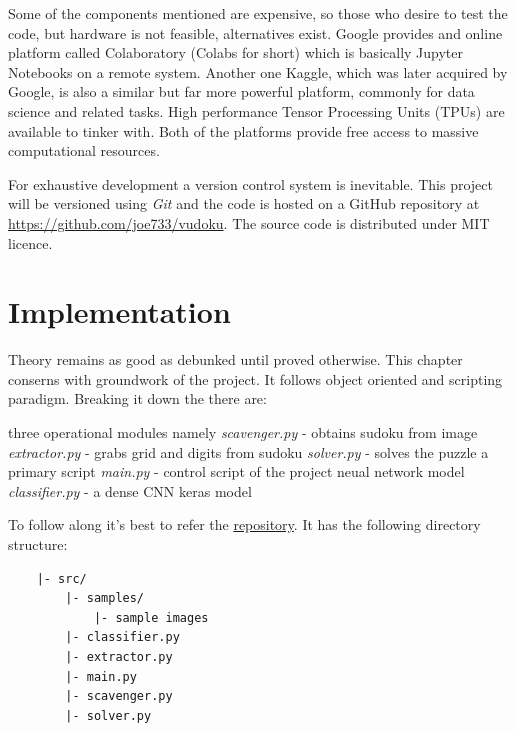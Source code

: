 \documentclass[12pt, a4paper]{report}
\begin{document}
Some of the components mentioned are expensive, so those who desire to test the code, but hardware is not feasible, alternatives exist. Google provides and online platform called Colaboratory (Colabs for short) which is basically Jupyter Notebooks on a remote system. Another one Kaggle, which was later acquired by Google, is also a similar but far more powerful platform, commonly for data science and related tasks. High performance Tensor Processing Units (TPUs) are available to tinker with. Both of the platforms provide free access to massive computational resources.

For exhaustive development a version control system is inevitable. This project will be versioned using \emph{Git} and the code is hosted on a GitHub repository at \url{https://github.com/joe733/vudoku}. The source code is distributed under MIT licence.
\vspace*{\fill}

\chapter{Implementation}
\label{chap:implementation}
\thispagestyle{fancy}
\hspace{0.5cm} Theory remains as good as debunked until proved otherwise. This chapter conserns with groundwork of the project. It follows object oriented and scripting paradigm. Breaking it down the there are:

\begin{outline}
    \1 three operational modules namely
        \2 \textit{scavenger.py} - obtains sudoku from image
        \2 \textit{extractor.py} - grabs grid and digits from sudoku
        \2 \textit{solver.py} - solves the puzzle
    \1 a primary script
        \2 \textit{main.py} - control script of the project
    \1  neual network model
        \2 \textit{classifier.py} - a dense CNN keras model
\end{outline}

To follow along it's best to refer the \href{https://github.com/joe733/vudoku}{repository}. It has the following directory structure:

\begin{lstlisting}
    |- src/
        |- samples/
            |- sample images
        |- classifier.py
        |- extractor.py
        |- main.py
        |- scavenger.py
        |- solver.py
\end{lstlisting}
\end{document}
